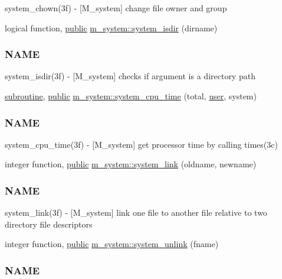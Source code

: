 \begin{DoxyCompactItemize}
\begin{DoxyCompactList}
system\+\_\+chown(3f) -\/ \mbox{[}M\+\_\+system\mbox{]} change file owner and group \end{DoxyCompactList}\item 
logical function, \hyperlink{M__stopwatch_83_8txt_a2f74811300c361e53b430611a7d1769f}{public} \hyperlink{namespacem__system_ad097988a031e64b4f21f856cf45c9c73}{m\+\_\+system\+::system\+\_\+isdir} (dirname)
\begin{DoxyCompactList}\small\item\em \subsubsection*{N\+A\+ME}

system\+\_\+isdir(3f) -\/ \mbox{[}M\+\_\+system\mbox{]} checks if argument is a directory path \end{DoxyCompactList}\item 
\hyperlink{M__stopwatch_83_8txt_acfbcff50169d691ff02d4a123ed70482}{subroutine}, \hyperlink{M__stopwatch_83_8txt_a2f74811300c361e53b430611a7d1769f}{public} \hyperlink{namespacem__system_a257d2b8987db850bc686507f19ccbe4a}{m\+\_\+system\+::system\+\_\+cpu\+\_\+time} (total, \hyperlink{M__stopwatch_83_8txt_ae5f4c36a1ae7eba7900823c418223f72}{user}, system)
\begin{DoxyCompactList}\small\item\em \subsubsection*{N\+A\+ME}

system\+\_\+cpu\+\_\+time(3f) -\/ \mbox{[}M\+\_\+system\mbox{]} get processor time by calling times(3c) \end{DoxyCompactList}\item 
integer function, \hyperlink{M__stopwatch_83_8txt_a2f74811300c361e53b430611a7d1769f}{public} \hyperlink{namespacem__system_aa77d9c9ae68750f515ba3d04d022c43c}{m\+\_\+system\+::system\+\_\+link} (oldname, newname)
\begin{DoxyCompactList}\small\item\em \subsubsection*{N\+A\+ME}

system\+\_\+link(3f) -\/ \mbox{[}M\+\_\+system\mbox{]} link one file to another file relative to two directory file descriptors \end{DoxyCompactList}\item 
integer function, \hyperlink{M__stopwatch_83_8txt_a2f74811300c361e53b430611a7d1769f}{public} \hyperlink{namespacem__system_a14ce0b9177815bc357dbdf3778687bb7}{m\+\_\+system\+::system\+\_\+unlink} (fname)
\begin{DoxyCompactList}\small\item\em \subsubsection*{N\+A\+ME}


\end{DoxyCompactList}
\end{DoxyCompactItemize}

